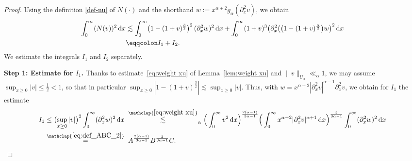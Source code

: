 \documentclass[reqno,12pt]{amsart}
\renewcommand{\d}{\ensuremath{\mathrm{d}}}
\renewcommand{\d}{\ensuremath{{\rm d}}}
\numberwithin{equation}{section}
\begin{document}
%
\begin{proof}
Using the definition \eqref{def-nu} of $N(\cdot)$ and the shorthand $w := x^{\alpha+2} g_\alpha(\partial_x^2 v)$, we obtain 
\begin{equation*}
\begin{split}
    \int_0^\infty (N(v))^2\, \d x
    &\lesssim
    \int_0^\infty \bigl(1 -(1+v)^\frac{3}{2}\bigr)^2\, (\partial_x^2 w)^2\, \d x + \int_0^\infty (1+v)^3 \big(\partial_x^2\bigl(\big(1 - (1+v)^\frac{\alpha}{2}\big) w\big)^2\, \d x
    \\
    &
    \eqqcolon I_1 + I_2.
\end{split}
\end{equation*}
We estimate the integrals $I_1$ and $I_2$ separately.

%
\bigskip
%

\noindent\textbf{Step 1: Estimate for $I_1$. }
Thanks to estimate~\eqref{eq:weight xu} of Lemma~\ref{lem:weight xu} and $\|v\|_{U_\alpha} \ll_\alpha 1$, we may assume $\sup_{x \geq 0} |v| \leq \frac{1}{2} < 1$, so that in particular $\sup_{x \ge 0} |1-(1+v)^{\frac{3}{2}}| \lesssim \sup_{x \ge 0} |v|$. Thus, with $w = x^{\alpha+2} |\partial_x^2 v|^{\alpha-1} \partial_x^2 v$, we obtain for $I_1$ the estimate
%
\begin{align}
    I_1
    &\leq
    \bigl(\sup_{x \geq 0} |v|\bigr)^2 \int_0^\infty (\partial_x^2 w)^2\, \d x \; \stackrel{\mathclap{\eqref{eq:weight xu}}}{\lesssim}_{\alpha}
    \Big(\int_0^\infty v^2\, \d x\Big)^\frac{2(\alpha-1)}{3\alpha-1} 
    \Big(\int_0^\infty x^{\alpha+2} |\partial_x^2 v|^{\alpha+1}\, \d x\Big)^\frac{2}{3\alpha-1}
    \int_0^\infty (\partial_x^2 w)^2\, \d x \nonumber \\
    &\stackrel{\mathclap{\eqref{eq:def_ABC_2}}}{=} \;
    A^\frac{2(\alpha-1)}{3\alpha-1}
    B^\frac{2}{3\alpha-1}
    C. \label{nonlinear-i1}
\end{align}
%

%
\bigskip
%


\end{proof}
\end{document}
